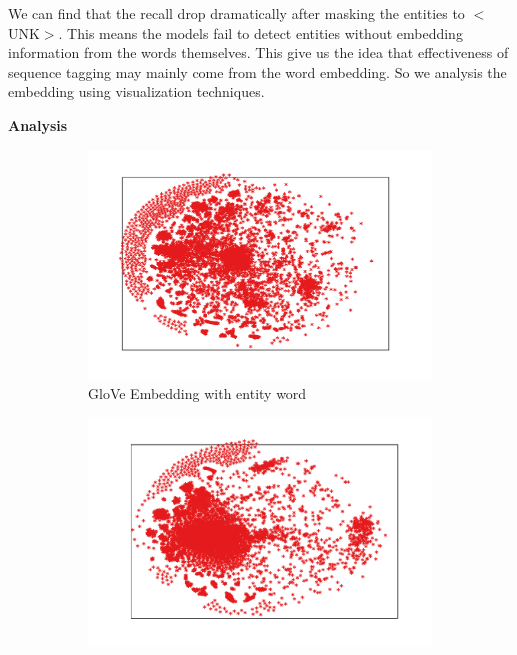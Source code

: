 \documentclass{article}
\begin{document}
We can find that the recall drop dramatically after masking the entities to $<$UNK$>$. This means the models fail to detect entities without embedding information from the words themselves. This give us the idea that effectiveness of sequence tagging may mainly come from the word embedding. So we analysis the embedding using visualization techniques.

\noindent \textbf{Analysis}

\begin{figure}[t]
	\centering
	\begin{subfigure}[t]{0.24\textwidth}
		\includegraphics[width=\linewidth]{glove_embedding_positive_mirror.pdf}
		\caption{GloVe Embedding with entity word}
		\label{fig:glove_positive}
	\end{subfigure} \hfil 
	\begin{subfigure}[t]{0.24\textwidth}
		\includegraphics[width=\linewidth]{bi_lstm_gold_positive.pdf}

\end{subfigure}
\end{figure}
\end{document}
